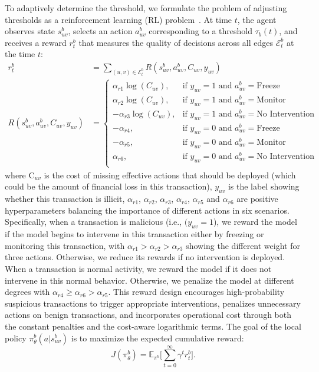 \documentclass[11pt,english]{article}
\begin{document}
To adaptively determine the threshold, we formulate the problem of adjusting thresholds as a reinforcement learning (RL) problem~\parencite{li2017deep, szepesvari2022algorithms, ladosz2022exploration}. At time $t$, the agent observes state $s_{uv}^b$, selects an action $a_{uv}^b$ corresponding to a threshold $\tau_b(t)$, and receives a reward $r_t^b$ that measures the quality of decisions across all edges $\mathcal{E}^{b}_t$ at the time $t$:
\begin{align}
    r_t^b &= \sum_{(u,v)\in \mathcal{E}^{b}_t} R(s_{uv}^b, a_{uv}^b, C_{uv}, y_{uv}) \\
    R(s_{uv}^b, a_{uv}^b, C_{uv}, y_{uv}) &= 
    \begin{cases}
        \alpha_{r1}\log(C_{uv}), & \text{if } y_{uv}=1 \text{ and } a_{uv}^b = \text{Freeze}   \\
        \alpha_{r2}\log(C_{uv}), & \text{if } y_{uv}=1 \text{ and } a_{uv}^b = \text{Monitor} \\
        -\alpha_{r3}\log(C_{uv}), & \text{if } y_{uv}=1 \text{ and } a_{uv}^b = \text{No Intervention} \\
        -\alpha_{r4}, & \text{if } y_{uv}=0 \text{ and } a_{uv}^b = \text{Freeze}   \\
        -\alpha_{r5}, & \text{if } y_{uv}=0 \text{ and } a_{uv}^b = \text{Monitor} \\
        \alpha_{r6}, & \text{if } y_{uv}=0 \text{ and } a_{uv}^b = \text{No Intervention} \\
     \end{cases}
\end{align}
where $\text{C}_{uv}$ is the cost of missing effective actions that should be deployed (which could be the amount of financial loss in this transaction), $y_{uv}$ is the label showing whether this transaction is illicit, $\alpha_{r1}$, $\alpha_{r2}$, $\alpha_{r3}$, $\alpha_{r4}$, $\alpha_{r5}$ and $\alpha_{r6}$ are positive hyperparameters balancing the importance of different actions in six scenarios. Specifically, when a transaction is malicious (i.e.,  $(y_{uv}=1$), we reward the model if the model begins to intervene in this transaction either by freezing or monitoring this transaction, with $\alpha_{r1} > \alpha_{r2} > \alpha_{r3}$ showing the different weight for three actions. Otherwise, we reduce its rewards if no intervention is deployed. When a transaction is normal activity, we reward the model if it does not intervene in this normal behavior. Otherwise, we penalize the model at different degrees with $\alpha_{r4} \geq \alpha_{r6} >\alpha_{r5}$. This reward design encourages high-probability suspicious transactions to trigger appropriate interventions, penalizes unnecessary actions on benign transactions, and incorporates operational cost through both the constant penalties and the cost-aware logarithmic terms. The goal of the local policy $\pi_\theta^b(a|s_{uv}^b)$ is to maximize the expected cumulative reward:
\begin{equation}
    J(\pi_\theta^b) = \mathbb{E}_{\pi^b}\!\Big[\sum_{t=0}^{\infty} \gamma^t r_t^b \Big].
\end{equation}
\end{document}
